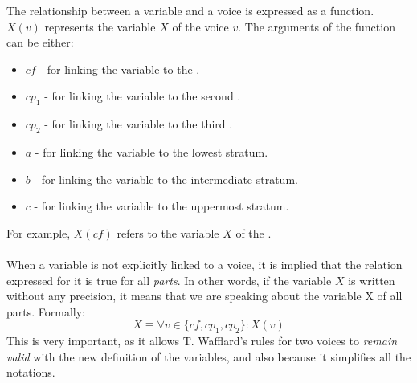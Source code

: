 The relationship between a variable and a voice is expressed as a function. $X(v)$ represents the variable $X$ of the voice $v$. The arguments of the function can be either:
\begin{itemize}
    \item $\mathit{cf}$ - for linking the variable to the \cf.
    \item $cp_1$ - for linking the variable to the second \cp.
    \item $cp_2$ - for linking the variable to the third \cp.
    \item $a$ - for linking the variable to the lowest stratum.
    \item $b$ - for linking the variable to the intermediate stratum.
    \item $c$ - for linking the variable to the uppermost stratum.
  \end{itemize}

\noindent For example, $X(\mathit{cf})$ refers to the variable $X$ of the \cf.

\paragraph{}
When a variable is not explicitly linked to a voice, it is implied that the relation expressed for it is true for all \textit{parts}. In other words, if the variable $X$ is written without any precision, it means that we are speaking about the variable X of all parts. Formally:
\begin{equation}
    X \equiv \forall v \in \{\mathit{cf}, cp_1, cp_2\}: X(v)    
\end{equation}
This is very important, as it allows T. Wafflard's rules for two voices to \textit{remain valid} with the new definition of the variables, and also because it simplifies all the notations.

